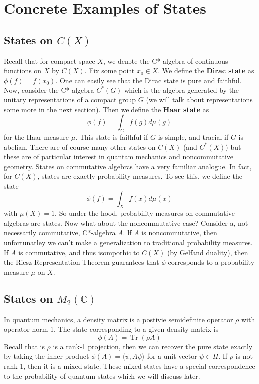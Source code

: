 \section{Concrete Examples of States}
\subsection{States on \( C(X) \)}
Recall that for compact space $X$, we denote the C*-algebra of continuous functions
on $X$ by $C(X)$. Fix some point $x_0 \in X$. We define the \textbf{Dirac state} as
$\phi(f) = f(x_0)$. One can easily see that the Dirac state is pure and faithful.
Now, consider the C*-algebra $C^*(G)$ which is the algebra generated by the unitary representations
of a compact group $G$ (we will talk about representations some more in the next section).
Then we define the \textbf{Haar state} as
\begin{equation*}
    \phi(f) = \int_G f(g)d\mu (g)
\end{equation*}
for the Haar measure $\mu$. This state is faithful if $G$ is simple, and tracial if
$G$ is abelian. There are of course many other states on $C(X)$ (and $C^*(X)$) but
these are of particular interest in quantam mechanics and noncommutative geometry.
States on commutative algebras have a very familiar analogue. In fact, for $C(X)$,
states are exactly probability measures. To see this, we define the state
\begin{equation*}
    \phi(f) = \int_X f(x) d \mu(x)   
\end{equation*}
with $\mu(X) = 1$. So under the hood, probability measures on commutative algebras
are states. Now what about the noncommutative case? Consider a, not necessarily commutative,
C*-algebra $A$. If $A$ is noncommutative, then unfortunatley we can't make a generalization
to traditional probability measures. If $A$ is commutative, and thus isomporhic to
$C(X)$ (by Gelfand duality), then the Riesz Representation Theorem guarantees that $\phi$ corresponds
to a probability measure $\mu$ on $X$.


\subsection{States on \( M_2(\mathbb{C}) \)}
In quantum mechanics, a density matrix is a postivie semidefinite operator $\rho$
with operator norm 1. The state corresponding to a given density matrix is
\begin{equation*}
    \phi(A) = \operatorname{Tr}(\rho A)
\end{equation*}
Recall that is $\rho$ is a rank-1 projection, then we can recover the pure state exactly
by taking the inner-product $\phi(A) = \langle \psi, A\psi \rangle$ for a unit vector
$\psi \in H$. If $\rho$ is not rank-1, then it is a mixed state. These mixed states
have a special correspondence to the probability of quantum states which we will
discuss later.

